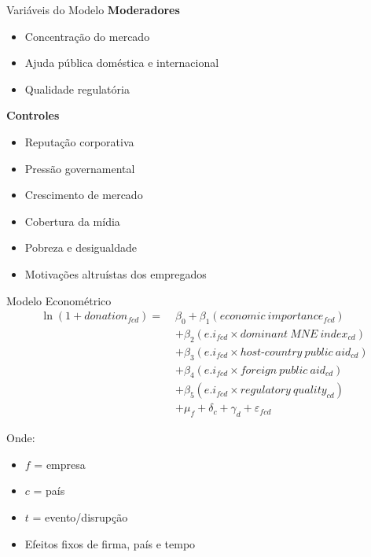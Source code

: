 \documentclass[
  10pt,
  ignorenonframetext,
  aspectratio=169,
  brazilian,
]{beamer}
\providecommand{\tightlist}{%
  \setlength{\itemsep}{0pt}\setlength{\parskip}{0pt}}
\begin{document}
\begin{frame}{Variáveis do Modelo}
\label{variuxe1veis-do-modelo-1}
\textbf{Moderadores}

\begin{itemize}
\tightlist
\item
  Concentração do mercado
\item
  Ajuda pública doméstica e internacional
\item
  Qualidade regulatória
\end{itemize}

\textbf{Controles}

\begin{itemize}
\tightlist
\item
  Reputação corporativa
\item
  Pressão governamental
\item
  Crescimento de mercado
\item
  Cobertura da mídia
\item
  Pobreza e desigualdade
\item
  Motivações altruístas dos empregados
\end{itemize}
\end{frame}

\begin{frame}{Modelo Econométrico}
\label{modelo-economuxe9trico}
\begin{equation}
\begin{aligned}
\ln(1 + donation_{fcd}) =\;& \beta_0 
+ \beta_1(economic\ importance_{fcd}) \\
&+ \beta_2(e.i_{fcd} \times dominant\ MNE\ index_{cd}) \\
&+ \beta_3(e.i_{fcd} \times host\text{-}country\ public\ aid_{cd}) \\
&+ \beta_4(e.i_{fcd} \times foreign\ public\ aid_{cd}) \\
&+ \beta_5(e.i_{fcd} \times regulatory\ quality_{cd}) \\
&+ \mu_f + \delta_c + \gamma_d + \varepsilon_{fcd}
\end{aligned}
\end{equation}

Onde:

\begin{itemize}
\tightlist
\item
  \(f\) = empresa
\item
  \(c\) = país
\item
  \(t\) = evento/disrupção
\item
  Efeitos fixos de firma, país e tempo
\end{itemize}
\end{frame}
\end{document}
